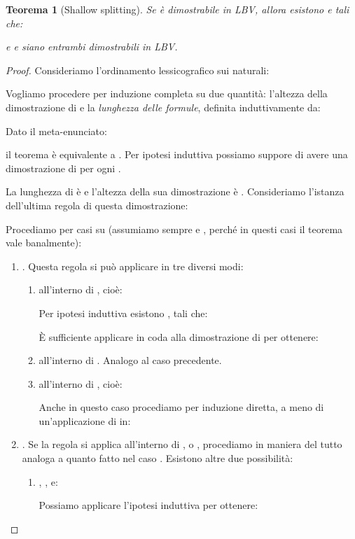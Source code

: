\documentclass[12pt,a4paper,openright,twoside]{report}
\newtheorem{thm}{Teorema}[section]
\begin{document}
\begin{thm}[Shallow splitting]\label{thm:shallow_split}
Se  \`e dimostrabile in \textsf{LBV}, allora esistono  e  tali che:

e  e  siano entrambi dimostrabili in \textsf{LBV}.
\end{thm}
\begin{proof}
Consideriamo l'ordinamento lessicografico sui naturali:

Vogliamo procedere per induzione completa su due quantit\`a: l'altezza della dimostrazione di  e la \emph{lunghezza delle formule}, definita induttivamente da:

Dato il meta-enunciato:

il teorema \`e equivalente a . Per ipotesi induttiva possiamo suppore di avere una dimostrazione di  per ogni .

La lunghezza di  \`e  e l'altezza della sua dimostrazione \`e . Consideriamo l'istanza dell'ultima regola di questa dimostrazione:

Procediamo per casi su  (assumiamo sempre  e , perch\'e in questi casi il teorema vale banalmente):
\begin{enumerate}
	\item . Questa regola si pu\`o applicare in tre diversi modi:
	\begin{enumerate}[label=\arabic{enumi}.\arabic*.]
		\item all'interno di , cio\`e:
		
		Per ipotesi induttiva esistono ,  tali che:
		
		\`E sufficiente applicare  in coda alla dimostrazione di  per ottenere:
		
		\item all'interno di . Analogo al caso precedente.
		\item all'interno di , cio\`e:
		
		Anche in questo caso procediamo per induzione diretta, a meno di un'applicazione di  in:
		
	\end{enumerate}
	\item . Se la regola si applica all'interno di ,  o , procediamo in maniera del tutto analoga a quanto fatto nel caso . Esistono altre due possibilit\`a:
	\begin{enumerate}[label=\arabic{enumi}.\arabic*.]
		\item , ,  e:
		
		Possiamo applicare l'ipotesi induttiva per ottenere:
		

\end{enumerate}
\end{enumerate}
\end{proof}
\end{document}
